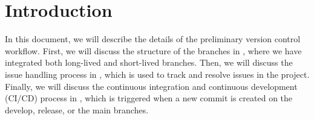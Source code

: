 \section{Introduction} \label{section: introduction}

In this document, we will describe the details of the preliminary version control workflow.
First, we will discuss the structure of the branches in , where we have integrated both long-lived and short-lived branches.
Then, we will discuss the issue handling process in , which is used to track and resolve issues in the project.
Finally, we will discuss the continuous integration and continuous development (CI/CD) process in , which is triggered when a new commit is created on the develop, release, or the main branches.
